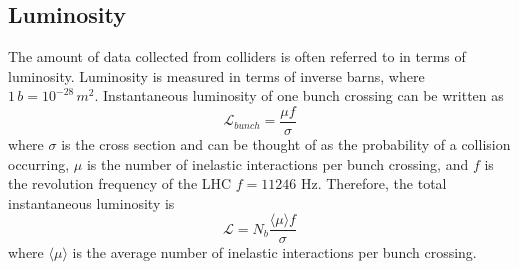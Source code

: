 	\subsection{Luminosity}\label{ssec:lumi}
		The amount of data collected from colliders is often referred to in terms of luminosity. Luminosity is measured in terms of inverse barns, where $1 \, b = 10^{-28} \, m^2$. Instantaneous luminosity of one bunch crossing can be written as 
		\begin{equation}\label{eqn:bunch-lumi}
		\mathcal{L}_{bunch} = \frac{ \mu  f }{\sigma}
		\end{equation}
		where $\sigma$ is the cross section and can be thought of as the probability of a collision occurring, $\mu$ is the number of inelastic interactions per bunch crossing, and $f$ is the revolution frequency of the LHC $f=11246$ Hz. Therefore, the total instantaneous luminosity is 
		\begin{equation}\label{eqn:tot-inst-lumi}
		\mathcal{L} = N_b \frac{ \langle \mu \rangle f}{\sigma}
		\end{equation}
		where $\langle \mu \rangle$ is the average number of inelastic interactions per bunch crossing. 

